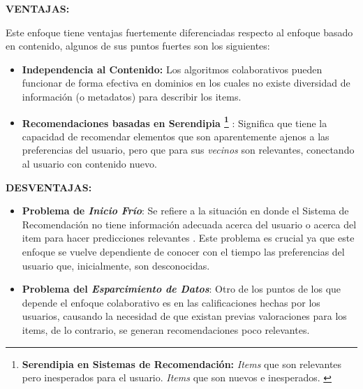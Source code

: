 \textbf{VENTAJAS:}


Este enfoque tiene ventajas fuertemente diferenciadas respecto al enfoque basado en contenido, algunos de sus puntos fuertes son los siguientes:

\begin{itemize}
    \item \textbf{Independencia al Contenido: } Los algoritmos colaborativos pueden funcionar de forma efectiva en dominios en los cuales no existe diversidad de información (o metadatos) para describir los items.
    \item \textbf{Recomendaciones basadas en Serendipia \footnote{\textbf{Serendipia en Sistemas de Recomendación: } \textit{Items} que son relevantes pero inesperados para el usuario. \textit{Items} que son nuevos e inesperados. \parencite{Kotkov2020Serendipity}} }: Significa que tiene la capacidad de recomendar elementos que son aparentemente ajenos a las preferencias del usuario, pero que para sus \textit{vecinos} son relevantes, conectando al usuario con contenido nuevo.
\end{itemize}

\textbf{DESVENTAJAS:}

\begin{itemize}
    \item \textbf{Problema de \textit{Inicio Frío}}: Se refiere a la situación en donde el Sistema de Recomendación no tiene información adecuada acerca del usuario o acerca del item para hacer predicciones relevantes \parencite{Burke2007}. Este problema es crucial ya que este enfoque se vuelve dependiente de conocer con el tiempo las preferencias del usuario que, inicialmente, son desconocidas.

    \item \textbf{Problema del \textit{Esparcimiento de Datos}}: Otro de los puntos de los que depende el enfoque colaborativo es en las calificaciones hechas por los usuarios, causando la necesidad de que existan previas valoraciones para los items, de lo contrario, se generan recomendaciones poco relevantes.
\end{itemize}

